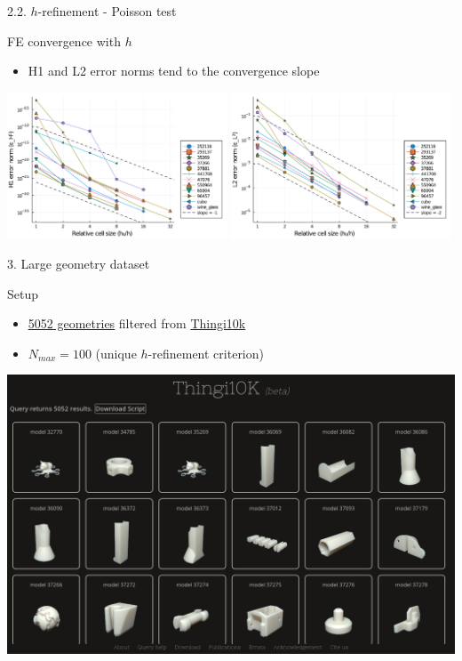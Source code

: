 \documentclass{beamer}
\begin{document}
\begin{frame}{2.2. $h$-refinement - Poisson test}
  \begin{block}{FE convergence with $h$}
  \begin{itemize}
    \item
      H1 and L2 error norms tend to the convergence slope
  \end{itemize}
  \end{block}

  \includegraphics[width=0.49\textwidth]{../analysis/plots/x_nmax_y_error_h1}
  \includegraphics[width=0.49\textwidth]{../analysis/plots/x_nmax_y_error_l2}
\end{frame}

\begin{frame}{3. Large geometry dataset}
  \begin{block}{Setup}
    \begin{itemize}
      \item
  
        \href{https://ten-thousand-models.appspot.com/results.html?q=is+closed\%2C+is+oriented\%2C+is+manifold\%2C+is+not+degenerate\%2C+without+self-intersection\%2C+\%23df\%3D0}{\underline{5052 geometries}}
        filtered from \href{https://ten-thousand-models.appspot.com}{Thingi10k}

        
      \item
        $N_{max} = 100 $ (unique $h$-refinement criterion)
    \end{itemize}

  \end{block}

  \centering
  \includegraphics[width=.75\textwidth]{thingi10k_screenshot}
\end{frame}
\end{document}
